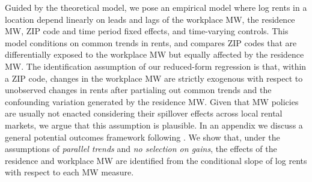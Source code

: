 Guided by the theoretical model, we pose an empirical model where log rents in 
a location depend linearly on
leads and lags of the workplace MW,
the residence MW,
ZIP code and time period fixed effects, and 
time-varying controls.
This model conditions on common trends in rents, and compares ZIP codes
that are differentially exposed to the workplace MW but equally affected by the 
residence MW.
The identification assumption of our reduced-form regression is that,
within a ZIP code, changes in the workplace MW are strictly exogenous with 
respect to unobserved changes in rents after partialing out common trends
and the confounding variation generated by the residence MW.
Given that MW policies are usually not enacted considering their spillover
effects across local rental markets, we argue that this assumption is plausible.
In an appendix we discuss a general potential outcomes framework following
\textcite{CallawayEtAl2021}.%
We show that, under the assumptions of \textit{parallel trends} and 
\textit{no selection on gains}, 
the effects of the residence and workplace MW are identified from the 
conditional slope of log rents with respect to each MW measure.


